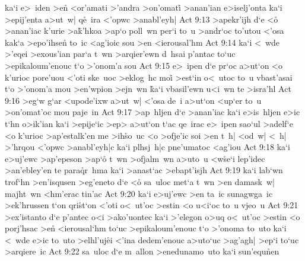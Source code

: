 ka`i
e>~iden
>en\r{}
<or'amati
>'andra
>on'omati\r{}
>anan'ian
e>iselj'onta
ka`i
>epij'enta
a>ut~w|
q\r{e}~ira
<'opwc
>anabl'eyh|\bibvsend
\vs Act 9:13
>apekr'ijh
d`e
<o\r{}
>anan'iac
k'urie
>a\r{k}'hkoa
>ap`o
poll~wn
per`i
to~u
>andr`oc
to'utou
<'osa
kak`a
>epo'ihsen\r{}
to~ic
<ag'ioic
sou
>en
<ierousal'hm\bibvsend
\vs Act 9:14
ka`i
<~wde
>'eqei
>exous'ian
par`a
t~wn
>arqier'ewn
d~hsai
p'antac
to`uc
>epikaloum'enouc
t`o
>'onom'a
sou\bibvsend
\vs Act 9:15
e>~ipen
d`e
pr`oc
a>ut`on
<o
k'urioc
pore'uou
<'oti
ske~uoc
>eklog~hc
moi\r{}
>est`in
o<~utoc
to~u
vbast'asai
t`o
>'onom'a
mou
>en'wpion
>ejn~wn
\r{k}a`i
vbasil'ewn
u<i~wn
te
>isra'hl\bibvsend
\vs Act 9:16
>eg`w
g`ar
<upode'ixw
a>ut~w|
<'osa
de~i
a>ut`on
<up`er
to~u
>on'omat'oc
mou
paje~in\bibvsend
\vs Act 9:17
>ap~hljen
d`e
>anan'iac
ka`i
e>is~hljen
e>ic
t`hn
o>ik'ian
ka`i
>epije`ic
>ep>
a>ut`on
t`ac
qe~irac
e>~ipen
sao`ul
>adelf`e
<o
k'urioc
>ap'estalk'en
me
>ih\r{s}o~uc
<o
>ofje'ic
soi
>en
t~h|
<od~w|
<~h|
>'hrqou
<'opwc
>anabl'eyh|c
ka`i
plhsj~h|c
pne'umatoc
<ag'iou\bibvsend
\vs Act 9:18
ka`i
e>uj'ewc
>ap'epeson
>ap`o\r{}
t~wn
>ofjalm~wn
a>uto~u
<w\r{s}e`i
lep'idec
>an'ebley'en
te
para\r{q}r~hma
ka`i
>anast`ac
>ebapt'isjh\bibvsend
\vs Act 9:19
ka`i
lab`wn
trof`hn
>en'isqusen
>eg'eneto
d`e
<o\r{}
sa~uloc
met`a
t~wn
>en
damask~w|
majht~wn
<hm'erac
tin'ac\bibvsend
\vs Act 9:20
ka`i
e>uj'ewc
>en
ta~ic
sunagwga~ic
>ek'hrussen
t`on
qri\r{s}t`on
<'oti
o<~ut'oc
>estin
<o
u<i`oc
to~u
vjeo~u\bibvsend
\vs Act 9:21
>ex'istanto
d`e
p'antec
o<i
>ako'uontec
ka`i
>'elegon
o>uq
o<~ut'oc
>estin
<o
porj'hsac
>e\r{n}
<ierousal`hm
to`uc
>epikaloum'enouc
t`o
>'onoma
to~uto
ka`i
<~wde
e>ic
to~uto
>elhl'uj\r{e}i
<'ina
dedem'enouc
a>uto`uc
>ag'agh|
>ep`i
to`uc
>arqiere~ic\bibvsend
\vs Act 9:22
sa~uloc
d`e
m~allon
>enedunamo~uto
ka`i
sun'equ\r{n}en
